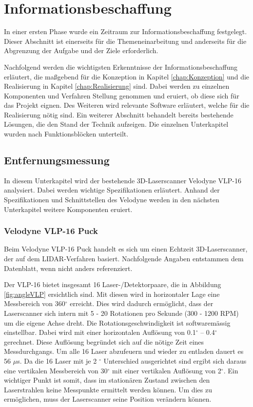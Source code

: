 \chapter{Informationsbeschaffung}
\label{Informationsbeschaffung}
 In einer ersten Phase wurde ein Zeitraum zur Informationsbeschaffung festgelegt. Dieser Abschnitt ist einerseits für die Themeneinarbeitung und anderseits für die Abgrenzung der Aufgabe und der Ziele erforderlich.

Nachfolgend werden die wichtigsten Erkenntnisse der Informationsbeschaffung erläutert, die maßgebend für die Konzeption in Kapitel \ref{chap:Konzeption} und die Realisierung in Kapitel \ref{chap:Realisierung} sind. Dabei werden zu einzelnen Komponenten und Verfahren Stellung genommen und eruiert, ob diese sich für das Projekt eignen. Des Weiteren wird relevante Software erläutert, welche für die Realisierung nötig sind. Ein weiterer Abschnitt behandelt bereits bestehende Lösungen, die den Stand der Technik aufzeigen. Die einzelnen Unterkapitel wurden nach Funktionsblöcken unterteilt.

\section{Entfernungsmessung}
\label{sec:Entfernungsmessung}
In diesem Unterkapitel wird der bestehende 3D-Laserscanner Velodyne VLP-16 analysiert. Dabei werden wichtige Spezifikationen erläutert. Anhand der Spezifikationen und Schnittstellen des Velodyne werden in den nächsten Unterkapitel weitere Komponenten eruiert.   

\subsection{Velodyne VLP-16 Puck}
\label{subsec:Velodyne}
Beim Velodyne VLP-16 Puck handelt es sich um einen Echtzeit 3D-Laserscanner, der auf dem \ac{LIDAR}-Verfahren basiert. Nachfolgende Angaben entstammen dem Datenblatt, wenn nicht anders referenziert. \protect\cite{velodyne}

Der VLP-16 bietet insgesamt 16 Laser-/Detektorpaare, die in Abbildung \ref{fig:angleVLP} ersichtlich sind. Mit diesen wird in horizontaler Lage eine Messbereich von 360$^\circ$  erreicht. Dies wird dadurch ermöglicht, dass der Laserscanner sich intern mit 5 - 20 Rotationen pro Sekunde (300 - 1200 RPM) um die eigene Achse dreht. Die Rotationsgeschwindigkeit ist softwaremässig einstellbar. Dabei wird mit einer horizontalen Auflösung von 0.1$^\circ$ – 0.4$^\circ$ gerechnet. Diese Auflösung begründet sich auf die nötige Zeit eines Messdurchgangs. Um alle 16 Laser abzufeuern und wieder zu entladen dauert es 56 $\mu$s.
Da die 16 Laser mit je 2 $^\circ$ Unterschied ausgerichtet sind ergibt sich daraus eine vertikalen Messbereich von 30$^\circ$ mit einer vertikalen Auflösung von 2$^\circ$. Ein wichtiger Punkt ist somit, dass im stationären Zustand zwischen den Laserstrahlen keine Messpunkte ermittelt werden können. Um dies zu ermöglichen, muss der Laserscanner seine Position verändern können.

